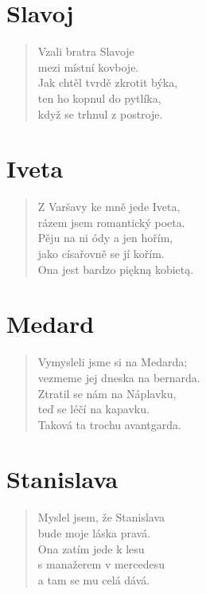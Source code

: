 \section*{Slavoj}
\begin{verse}
Vzali bratra Slavoje\\
mezi místní kovboje.\\
Jak chtěl tvrdě zkrotit býka,\\
ten ho kopnul do pytlíka,\\
když se trhnul z postroje.	
\end{verse}

\section*{Iveta}
\begin{verse}
Z Varšavy ke mně jede Iveta,\\
rázem jsem romantický poeta.\\
Pěju na ni ódy a jen hořím,\\
jako císařovně se jí kořím.\\
Ona jest bardzo piękną kobietą.	
\end{verse}

\section*{Medard}
\begin{verse}
Vymysleli jsme si na Medarda;\\
vezmeme jej dneska na bernarda.\\
Ztratil se nám na Náplavku,\\
teď se léčí na kapavku.\\
Taková ta trochu avantgarda.	
\end{verse}

\section*{Stanislava}
\begin{verse}
Myslel jsem, že Stanislava\\
bude moje láska pravá.\\
Ona zatím jede k lesu\\
s manažerem v mercedesu\\
a tam se mu celá dává.	
\end{verse}

